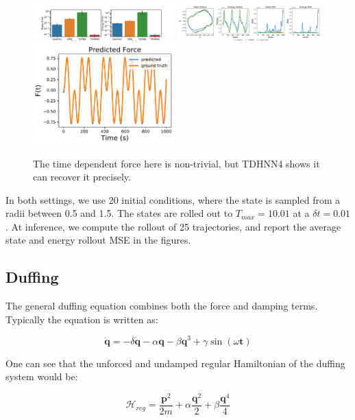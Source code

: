 \documentclass[twoside]{article}
\begin{document}
\begin{figure}[h!]
\centering
\includegraphics[width=0.49\textwidth]{figures/mass_spring_forced_2_errors.pdf}
\includegraphics[width=0.49\textwidth]{figures/mass_spring_forced_2_pred.pdf}
\includegraphics[width=0.49\textwidth]{figures/TDHNN4_mass_spring_force_2.pdf}
\caption{The time dependent force here is non-trivial, but TDHNN4 shows it can recover it precisely.}
\end{figure}

In both settings, we use 20 initial conditions, where the state is sampled from a radii between 0.5 and 1.5. The states are rolled out to $T_{max}=10.01$ at a $\delta t = 0.01$. At inference, we compute the rollout of 25 trajectories, and report the average state and energy rollout MSE in the figures.

\subsection{Duffing}

The general duffing equation combines both the force and damping terms. Typically the equation is written as:

\begin{equation}
\ddot{\mathbf{q}} = -\delta \dot{\mathbf{q}} -\alpha \mathbf{q} -\beta \mathbf{q}^3 +\gamma \sin(\omega \mathbf{t}) 
\end{equation}

One can see that the unforced and undamped regular Hamiltonian of the duffing system would be:

\begin{equation}
\mathcal{H}_{reg} = \frac{\mathbf{p}^2}{2m}+ \alpha \frac{\mathbf{q}^2}{2} + \beta \frac{\mathbf{q}^4}{4}
\end{equation}
\end{document}
